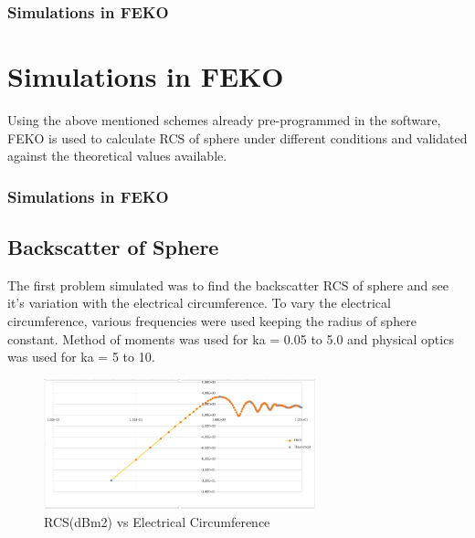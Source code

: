 \documentclass{beamer}
\begin{document}
\begin{frame}
\frametitle{Simulations in FEKO}
\section{Simulations in FEKO}
Using the above mentioned schemes already pre-programmed in the software, FEKO is used to calculate RCS of sphere under different conditions and validated against the theoretical values available.
\end{frame}
\begin{frame}
\frametitle{Simulations in FEKO}
\subsection{Backscatter of Sphere}
The first problem simulated was to find the backscatter RCS of sphere and see it's variation with the electrical circumference. To vary the electrical circumference, various frequencies were used keeping the radius of sphere constant. Method of moments was used for ka = 0.05 to 5.0 and physical optics was used for ka = 5 to 10. 
\begin{figure}[H]
\centering
\includegraphics[width = 0.7\textwidth]{backscatter.PNG}
\caption{RCS(dBm2) vs Electrical Circumference}
\end{figure}
\end{frame}
\end{document}
